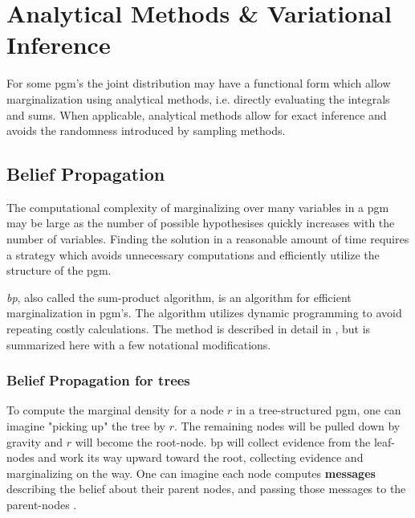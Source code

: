 \chapter{Analytical Methods \& Variational Inference}
For some \acrshort{pgm}'s the joint distribution may have a functional form which allow marginalization using analytical methods, i.e. directly evaluating the integrals and sums. When applicable, analytical methods allow for exact inference and avoids the randomness introduced by sampling methods. %


\section{Belief Propagation}
The computational complexity of marginalizing over many variables in a \acrshort{pgm} may be large as the number of possible hypothesises quickly increases with the number of variables. Finding the solution in a reasonable amount of time requires a strategy which avoids unnecessary computations and efficiently utilize the structure of the \acrshort{pgm}. 

\textit{\acrfull{bp}}, also called the sum-product algorithm, is an algorithm for efficient marginalization in \acrshort{pgm}'s. The algorithm utilizes dynamic programming to avoid repeating costly calculations. The method is described in detail in \cite[p .~710]{murphy}, but is summarized here with a few notational modifications. 


\subsection{Belief Propagation for trees}
To compute the marginal density for a node $r$ in a tree-structured \acrshort{pgm}, one can imagine "picking up" the tree by $r$. The remaining nodes will be pulled down by gravity and $r$ will become the root-node. \acrshort{bp} will collect evidence from the leaf-nodes and work its way upward toward the root, collecting evidence and marginalizing on the way. One can imagine each node computes \textbf{messages} describing the belief about their parent nodes, and passing those messages to the parent-nodes \cite{murphy}.

